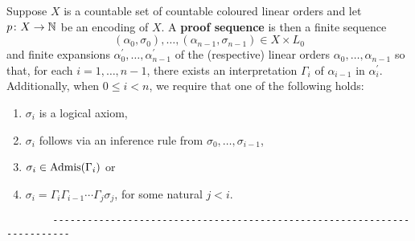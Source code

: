 \begin{dfn}
	Suppose $X$ is a countable set of countable coloured linear orders and let $p\colon X\to\mathbb{N}$ be an encoding of $X$.  A \textbf{proof sequence} is then a finite sequence
	\begin{equation}
		(\alpha_0,\sigma_0),\dotsc,(\alpha_{n-1},\sigma_{n-1})\in X\times L_0
	\end{equation}
	and finite expansions $\alpha^\prime_0,\dotsc,\alpha^\prime_{n-1}$ of the (respective) linear orders $\alpha_0,\dotsc,\alpha_{n-1}$ so that, for each $i=1,\dotsc,n-1$, there exists an interpretation $\Gamma_i$ of $\alpha_{i-1}$ in $\alpha^\prime_i$.  Additionally, when $0\leq i<n$, we require that one of the following holds:
	\begin{enumerate}
		\item	$\sigma_i$ is a logical axiom,
		\item	$\sigma_i$ follows via an inference rule from $\sigma_0,\dotsc,\sigma_{i-1}$,
		\item	$\sigma_i\in\operatorname{Admis}(\Gamma_i)$ or
		\item	$\sigma_i=\Gamma_i\Gamma_{i-1}\dotsb\Gamma_j\sigma_j$, for some natural $j<i$.
	\end{enumerate}
\end{dfn}
\vfill
\begin{verbatim}
		-------------------------------------------------------------------------
	\end{verbatim}

